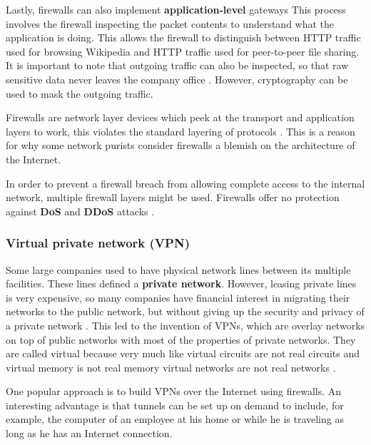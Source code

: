 Lastly, firewalls can also implement \textbf{application-level} gateways
This process involves the firewall inspecting the packet contents to understand what the application is doing.
This allows the firewall to distinguish between HTTP traffic used for browsing Wikipedia and HTTP traffic used for peer-to-peer file sharing.
It is important to note that outgoing traffic can also be inspected, so that raw sensitive data never leaves the company office \cite[p.~819]{computer-networks-tanenbaum-2012}.
However, cryptography can be used to mask the outgoing traffic.

Firewalls are network layer devices which peek at the transport and application layers to work, this violates the standard layering of protocols \cite[p.~820]{computer-networks-tanenbaum-2012}.
This is a reason for why some network purists consider firewalls a blemish on the architecture of the Internet.

In order to prevent a firewall breach from allowing complete access to the internal network, multiple firewall layers might be used.
Firewalls offer no protection against \textbf{DoS} and \textbf{DDoS} attacks \cite[p.~820]{computer-networks-tanenbaum-2012}.

\subsubsection{Virtual private network (VPN)}

Some large companies used to have physical network lines between its multiple facilities.
These lines defined a \textbf{private network}.
However, leasing private lines is very expensive, so many companies have financial interest in migrating their networks to the public network, but without giving up the security and privacy of a private network \cite[p.~821]{computer-networks-tanenbaum-2012}.
This led to the invention of VPNs, which are overlay networks on top of public networks with most of the properties of private networks.
They are called virtual because very much like virtual circuits are not real circuits and virtual memory is not real memory virtual networks are not real networks \cite[p.~821]{computer-networks-tanenbaum-2012}.

One popular approach is to build VPNs over the Internet using firewalls. An interesting advantage is that tunnels can be set up on demand to include, for example, the computer of an employee at his home or while he is traveling as long as he has an Internet connection.


